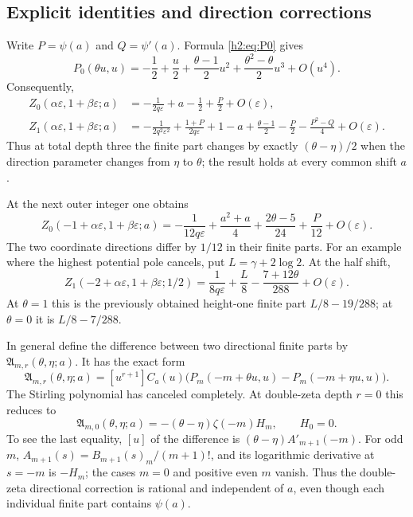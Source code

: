 \subsection{Explicit identities and direction corrections}

Write $P=\psi(a)$ and $Q=\psi'(a)$. Formula \eqref{h2:eq:P0}
gives
\[
 P_0(\theta u,u)=-\frac12+\frac u2
       +\frac{\theta-1}{2}u^2
       +\frac{\theta^2-\theta}{2}u^3+O(u^4).
\]
Consequently,
\begin{align}
 Z_0(\alpha\varepsilon,1+\beta\varepsilon;a)
 &= -\frac1{2q\varepsilon}+a-\frac12+\frac P2
                   +O(\varepsilon),\label{h2:eq:example00}\\
 Z_1(\alpha\varepsilon,1+\beta\varepsilon;a)
 &= -\frac1{2q^2\varepsilon^2}
      +\frac{1+P}{2q\varepsilon}
      +1-a+\frac{\theta-1}{2}-\frac P2
             -\frac{P^2-Q}{4}+O(\varepsilon).
 \label{h2:eq:example01}
\end{align}
Thus at total depth three the finite part changes by exactly
$(\theta-\eta)/2$ when the direction parameter changes from $\eta$
to $\theta$; the result holds at every common shift $a$.

At the next outer integer one obtains
\begin{equation}\label{h2:eq:example10}
 Z_0(-1+\alpha\varepsilon,1+\beta\varepsilon;a)
 =-\frac1{12q\varepsilon}
    +\frac{a^2+a}{4}+\frac{2\theta-5}{24}+\frac P{12}
                  +O(\varepsilon).
\end{equation}
The two coordinate directions differ by $1/12$ in their finite parts.
For an example where the highest potential pole cancels, put
$L=\gamma+2\log2$. At the half shift,
\begin{equation}\label{h2:eq:example21}
 Z_1(-2+\alpha\varepsilon,1+\beta\varepsilon;1/2)
    =\frac1{8q\varepsilon}+\frac L8-\frac{7+12\theta}{288}
                           +O(\varepsilon).
\end{equation}
At $\theta=1$ this is the previously obtained height-one finite part
$L/8-19/288$; at $\theta=0$ it is $L/8-7/288$.

In general define the difference between two directional finite parts
by $\mathfrak A_{m,r}(\theta,\eta;a)$. It has the exact form
\begin{equation}\label{h2:eq:anomaly}
 \mathfrak A_{m,r}(\theta,\eta;a)
 =[u^{r+1}]C_a(u)
       \bigl(P_m(-m+\theta u,u)-P_m(-m+\eta u,u)\bigr).
\end{equation}
The Stirling polynomial has canceled completely. At double-zeta depth
$r=0$ this reduces to
\begin{equation}\label{h2:eq:anomaly0}
 \mathfrak A_{m,0}(\theta,\eta;a)
   =-(\theta-\eta)\zeta(-m)H_m,
 \qquad H_0=0.
\end{equation}
To see the last equality, $[u]$ of the difference is
$(\theta-\eta)A'_{m+1}(-m)$. For odd $m$,
$A_{m+1}(s)=B_{m+1}(s)_m/(m+1)!$, and its logarithmic derivative
at $s=-m$ is $-H_m$; the cases $m=0$ and positive even $m$ vanish.
Thus the double-zeta directional correction is rational and independent
of $a$, even though each individual finite part contains $\psi(a)$.

